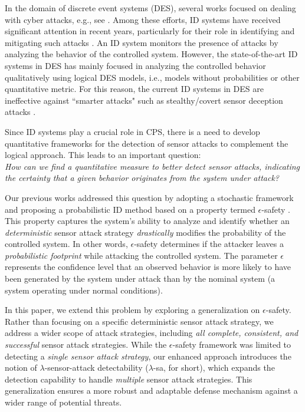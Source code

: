 In the domain of discrete event systems (DES), several works focused on dealing with cyber attacks, e.g., see \citep{Rashidinejad:2019,hadjicostis2022cybersecurity, OLIVEIRA2023100907}. Among these efforts, ID systems have received significant attention in recent years, particularly for their role in identifying and mitigating such attacks \citep{Thorsley:2006,Carvalho:2018,Lima:2019,meira-goes:2020towards,wang:2022,fritz2023detection,zhang2023robust,lin2024diagnosability, li2025diagnosability, kang2025diagnosability}. 
An ID system monitors the presence of attacks by analyzing the behavior of the controlled system. 
However, the state-of-the-art ID systems in DES has mainly focused in analyzing the controlled behavior qualitatively using logical DES models, i.e., models without probabilities or other quantitative metric.
For this reason, the current ID systems in DES are ineffective against ``smarter attacks" such as stealthy/covert sensor deception attacks \citep{Su:2018,meira-goes:2020synthesis,tong:2022,YAO2024deception}. 

Since ID systems play a crucial role in CPS, there is a need to develop quantitative frameworks for the detection of sensor attacks to complement the logical approach. 
This leads to an important question: \\
\emph{How can we find a quantitative measure to better detect sensor attacks, indicating the certainty that a given behavior originates from the system under attack?}

Our previous works addressed this question by adopting a stochastic framework and proposing a probabilistic ID method based on a property termed $\epsilon$-safety \citep{meira-goes:2020towards, Fahim2024-wodes}. 
This property captures the system's ability to analyze and identify whether an \emph{deterministic} sensor attack strategy \emph{drastically} modifies the probability of the controlled system. 
In other words, $\epsilon$-safety determines if the attacker leaves a \emph{probabilistic footprint} while attacking the controlled system. 
The parameter $\epsilon$ represents the confidence level that an observed behavior is more likely to have been generated by the system under attack than by the nominal system (a system operating under normal conditions). 

In this paper, we extend this problem by exploring a generalization on $\epsilon$-safety. 
Rather than focusing on a specific deterministic sensor attack strategy, we address a wider scope of attack strategies, including \emph{all complete, consistent, and successful} sensor attack strategies.  
While the $\epsilon$-safety framework was limited to detecting a \emph{single sensor attack strategy}, our enhanced approach introduces the notion of $\lambda$-sensor-attack detectability ($\lambda$-sa, for short), which expands the detection capability to handle \emph{multiple} sensor attack strategies. 
This generalization ensures a more robust and adaptable defense mechanism against a wider range of potential threats.

